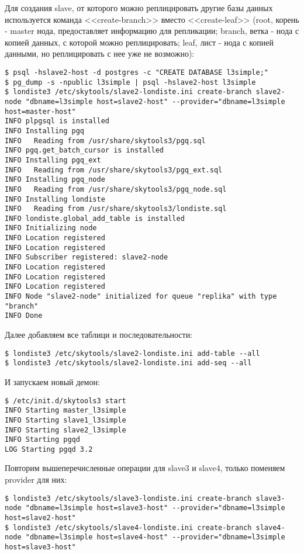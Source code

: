 Для создания slave, от которого можно реплицировать другие базы данных используется команда <<create-branch>> вместо <<create-leaf>> (root, корень - master нода, предоставляет информацию для репликации; branch, ветка - нода с копией данных, с которой можно реплицировать; leaf, лист - нода с копией данными, но реплицировать с нее уже не возможно):

\begin{lstlisting}[label=lst:londiste-cascade2,caption=Инициализируем slave2]
$ psql -hslave2-host -d postgres -c "CREATE DATABASE l3simple;"
$ pg_dump -s -npublic l3simple | psql -hslave2-host l3simple
$ londiste3 /etc/skytools/slave2-londiste.ini create-branch slave2-node "dbname=l3simple host=slave2-host" --provider="dbname=l3simple host=master-host"
INFO plpgsql is installed
INFO Installing pgq
INFO   Reading from /usr/share/skytools3/pgq.sql
INFO pgq.get_batch_cursor is installed
INFO Installing pgq_ext
INFO   Reading from /usr/share/skytools3/pgq_ext.sql
INFO Installing pgq_node
INFO   Reading from /usr/share/skytools3/pgq_node.sql
INFO Installing londiste
INFO   Reading from /usr/share/skytools3/londiste.sql
INFO londiste.global_add_table is installed
INFO Initializing node
INFO Location registered
INFO Location registered
INFO Subscriber registered: slave2-node
INFO Location registered
INFO Location registered
INFO Location registered
INFO Node "slave2-node" initialized for queue "replika" with type "branch"
INFO Done
\end{lstlisting}

Далее добавляем все таблици и последовательности:

\begin{lstlisting}[label=lst:londiste-cascade3,caption=Инициализируем slave2]
$ londiste3 /etc/skytools/slave2-londiste.ini add-table --all
$ londiste3 /etc/skytools/slave2-londiste.ini add-seq --all
\end{lstlisting}

И запускаем новый демон:

\begin{lstlisting}[label=lst:londiste-cascade4,caption=Инициализируем slave2]
$ /etc/init.d/skytools3 start
INFO Starting master_l3simple
INFO Starting slave1_l3simple
INFO Starting slave2_l3simple
INFO Starting pgqd
LOG Starting pgqd 3.2
\end{lstlisting}

Повторим вышеперечисленные операции для slave3 и slave4, только поменяем provider для них:

\begin{lstlisting}[label=lst:londiste-cascade5,caption=Инициализируем slave3 и slave4]
$ londiste3 /etc/skytools/slave3-londiste.ini create-branch slave3-node "dbname=l3simple host=slave3-host" --provider="dbname=l3simple host=slave2-host"
$ londiste3 /etc/skytools/slave4-londiste.ini create-branch slave4-node "dbname=l3simple host=slave4-host" --provider="dbname=l3simple host=slave3-host"
\end{lstlisting}

